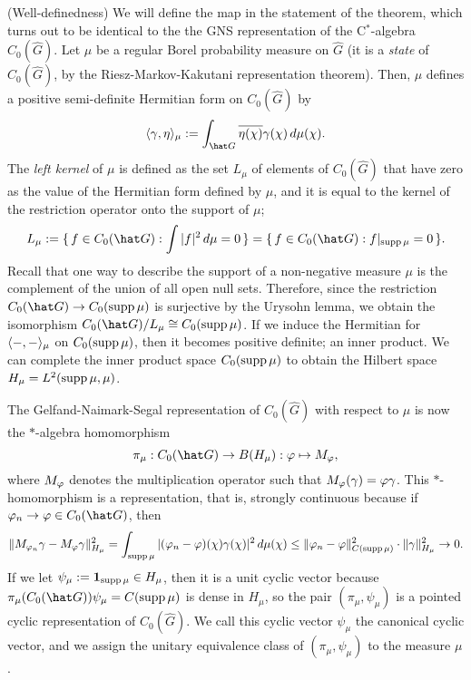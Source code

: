 \documentclass{../../small}
\begin{document}
\begin{pf}
(Well-definedness)
We will define the map in the statement of the theorem, which turns out to be identical to the the GNS representation of the C$^*$-algebra $C_0(\hat G)$.
Let $\mu$ be a regular Borel probability measure on $\hat G$ (it is a \emph{state} of $C_0(\hat G)$, by the Riesz-Markov-Kakutani representation theorem).
Then, $\mu$ defines a positive semi-definite Hermitian form on $C_0(\hat G)$ by
\[\<\gamma,\eta\>_\mu:=\int_{\hat G}\bar{\eta(\chi)}\gamma(\chi)\,d\mu(\chi).\]
The \emph{left kernel} of $\mu$ is defined as the set $L_\mu$ of elements of $C_0(\hat G)$ that have zero as the value of the Hermitian form defined by $\mu$, and it is equal to the kernel of the restriction operator onto the support of $\mu$;
\[L_\mu:=\{\,f\in C_0(\hat G):\int|f|^2\,d\mu=0\,\}=\{\,f\in C_0(\hat G):f|_{\supp\mu}=0\,\}.\]
Recall that one way to describe the support of a non-negative measure $\mu$ is the complement of the union of all open null sets.
Therefore, since the restriction $C_0(\hat G)\to C_0(\supp\mu)$ is surjective by the Urysohn lemma, we obtain the isomorphism $C_0(\hat G)/L_\mu\cong C_0(\supp\mu)$.
If we induce the Hermitian for $\langle-,-\rangle_\mu$ on $C_0(\operatorname{supp}\mu)$, then it becomes positive definite; an inner product.
We can complete the inner product space $C_0(\operatorname{supp}\mu)$ to obtain the Hilbert space $H_\mu=L^2(\operatorname{supp}\mu,\mu)$.

The Gelfand-Naimark-Segal representation of $C_0(\hat G)$ with respect to $\mu$ is now the $*$-algebra homomorphism
\[\pi_\mu:C_0(\hat G)\to B(H_\mu):\f\mapsto M_\f,\]
where $M_\varphi$ denotes the multiplication operator such that $M_\varphi(\gamma)=\varphi\gamma$.
This $*$-homomorphism is a representation, that is, strongly continuous because if $\f_n\to\f\in C_0(\hat G)$, then
\[\|M_{\varphi_n}\gamma-M_\varphi\gamma\|_{H_\mu}^2=\int_{\operatorname{supp}\mu}|(\varphi_n-\varphi)(\chi)\gamma(\chi)|^2\,d\mu(\chi)\le\|\varphi_n-\varphi\|_{C(\operatorname{supp}\mu)}^2\cdot\|\gamma\|_{H_\mu}^2\to0.\]
If we let $\psi_\mu:=\mathbf{1}_{\operatorname{supp}\mu}\in H_\mu$, then it is a unit cyclic vector because $\pi_\mu(C_0(\hat G))\psi_\mu=C(\supp\mu)$ is dense in $H_\mu$, so the pair $(\pi_\mu,\psi_\mu)$ is a pointed cyclic representation of $C_0(\hat G)$.
We call this cyclic vector $\psi_\mu$ the canonical cyclic vector, and we assign the unitary equivalence class of $(\pi_\mu,\psi_\mu)$ to the measure $\mu$.


\end{pf}
\end{document}
